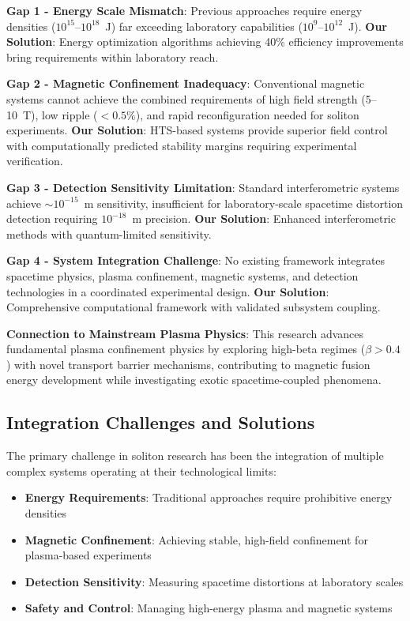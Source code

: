 \documentclass[12pt,a4paper]{article}
\begin{document}
\textbf{Gap 1 - Energy Scale Mismatch}: Previous approaches require energy densities ($10^{15}$--$10^{18}$~J) far exceeding laboratory capabilities ($10^{9}$--$10^{12}$~J). \textbf{Our Solution}: Energy optimization algorithms achieving 40\% efficiency improvements bring requirements within laboratory reach.

\textbf{Gap 2 - Magnetic Confinement Inadequacy}: Conventional magnetic systems cannot achieve the combined requirements of high field strength (5--10~T), low ripple ($<0.5\%$), and rapid reconfiguration needed for soliton experiments. \textbf{Our Solution}: HTS-based systems provide superior field control with computationally predicted stability margins requiring experimental verification.

\textbf{Gap 3 - Detection Sensitivity Limitation}: Standard interferometric systems achieve $\sim 10^{-15}$~m sensitivity, insufficient for laboratory-scale spacetime distortion detection requiring $10^{-18}$~m precision. \textbf{Our Solution}: Enhanced interferometric methods with quantum-limited sensitivity.

\textbf{Gap 4 - System Integration Challenge}: No existing framework integrates spacetime physics, plasma confinement, magnetic systems, and detection technologies in a coordinated experimental design. \textbf{Our Solution}: Comprehensive computational framework with validated subsystem coupling.

\textbf{Connection to Mainstream Plasma Physics}: This research advances fundamental plasma confinement physics by exploring high-beta regimes ($\beta > 0.4$) with novel transport barrier mechanisms, contributing to magnetic fusion energy development while investigating exotic spacetime-coupled phenomena.

\subsection{Integration Challenges and Solutions}

The primary challenge in soliton research has been the integration of multiple complex systems operating at their technological limits:
\begin{itemize}
\item \textbf{Energy Requirements}: Traditional approaches require prohibitive energy densities
\item \textbf{Magnetic Confinement}: Achieving stable, high-field confinement for plasma-based experiments
\item \textbf{Detection Sensitivity}: Measuring spacetime distortions at laboratory scales
\item \textbf{Safety and Control}: Managing high-energy plasma and magnetic systems
\end{itemize}
\end{document}
